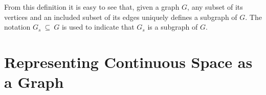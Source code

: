  \noindent From this definition it is easy to see
that, given a graph $G$, any subset of its vertices and an included
subset of its edges uniquely defines a subgraph of $G$.  The notation
$G_s ~{\subseteq}~ G$ is used to indicate that $G_s$ is a subgraph of
$G$.

\section{Representing Continuous Space as a Graph}

